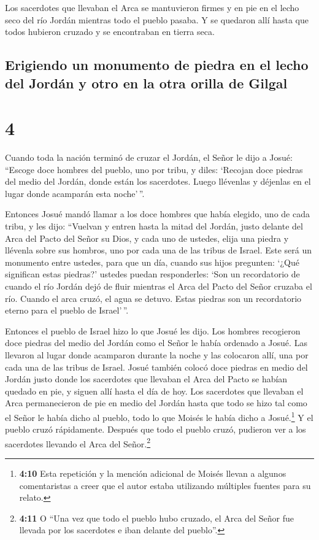  Los sacerdotes que llevaban el Arca se mantuvieron
firmes y en pie en el lecho seco del río Jordán mientras todo el pueblo
pasaba. Y se quedaron allí hasta que todos hubieron cruzado y se
encontraban en tierra seca.

\hypertarget{erigiendo-un-monumento-de-piedra-en-el-lecho-del-jorduxe1n-y-otro-en-la-otra-orilla-de-gilgal}{%
\subsection{Erigiendo un monumento de piedra en el lecho del Jordán y
otro en la otra orilla de
Gilgal}\label{erigiendo-un-monumento-de-piedra-en-el-lecho-del-jorduxe1n-y-otro-en-la-otra-orilla-de-gilgal}}

\hypertarget{section-3}{%
\section{4}\label{section-3}}

 Cuando toda la nación terminó de cruzar el Jordán, el
Señor le dijo a Josué:  ``Escoge doce hombres del pueblo,
uno por tribu,  y diles: `Recojan doce piedras del medio
del Jordán, donde están los sacerdotes. Luego llévenlas y déjenlas en el
lugar donde acamparán esta noche'\,''.

 Entonces Josué mandó llamar a los doce hombres que había
elegido, uno de cada tribu,  y les dijo: ``Vuelvan y
entren hasta la mitad del Jordán, justo delante del Arca del Pacto del
Señor su Dios, y cada uno de ustedes, elija una piedra y llévenla sobre
sus hombros, uno por cada una de las tribus de Israel. 
Este será un monumento entre ustedes, para que un día, cuando sus hijos
pregunten: `¿Qué significan estas piedras?'  ustedes
puedan responderles: `Son un recordatorio de cuando el río Jordán dejó
de fluir mientras el Arca del Pacto del Señor cruzaba el río. Cuando el
arca cruzó, el agua se detuvo. Estas piedras son un recordatorio eterno
para el pueblo de Israel'\,''.

 Entonces el pueblo de Israel hizo lo que Josué les dijo.
Los hombres recogieron doce piedras del medio del Jordán como el Señor
le había ordenado a Josué. Las llevaron al lugar donde acamparon durante
la noche y las colocaron allí, una por cada una de las tribus de Israel.
 Josué también colocó doce piedras en medio del Jordán
justo donde los sacerdotes que llevaban el Arca del Pacto se habían
quedado en pie, y siguen allí hasta el día de hoy.  Los
sacerdotes que llevaban el Arca permanecieron de pie en medio del Jordán
hasta que todo se hizo tal como el Señor le había dicho al pueblo, todo
lo que Moisés le había dicho a Josué.\footnote{\textbf{4:10} Esta
  repetición y la mención adicional de Moisés llevan a algunos
  comentaristas a creer que el autor estaba utilizando múltiples fuentes
  para su relato.} Y el pueblo cruzó rápidamente. 
Después que todo el pueblo cruzó, pudieron ver a los sacerdotes llevando
el Arca del Señor.\footnote{\textbf{4:11} O ``Una vez que todo el pueblo
  hubo cruzado, el Arca del Señor fue llevada por los sacerdotes e iban
  delante del pueblo''.}

